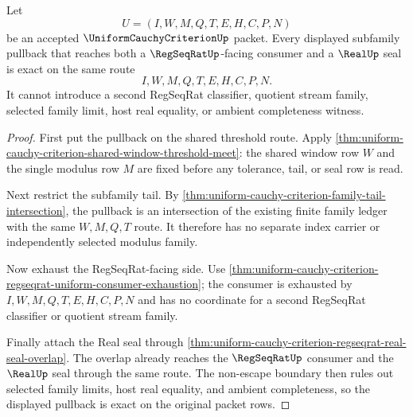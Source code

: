 \begin{theorem}
\label{thm:uniform-cauchy-criterion-regseqrat-real-seal-pullback-exactness}
Let
$$
U=(I,W,M,Q,T,E,H,C,P,N)
$$
be an accepted $\UniformCauchyCriterionUp$ packet. Every displayed subfamily pullback that reaches both a $\RegSeqRatUp$-facing consumer and a $\RealUp$ seal is exact on the same route
$$
I,W,M,Q,T,E,H,C,P,N.
$$
It cannot introduce a second RegSeqRat classifier, quotient stream family, selected family limit, host real equality, or ambient completeness witness.
\end{theorem}
\begin{proof}
First put the pullback on the shared threshold route. Apply \autoref{thm:uniform-cauchy-criterion-shared-window-threshold-meet}: the shared window row $W$ and the single modulus row $M$ are fixed before any tolerance, tail, or seal row is read.

Next restrict the subfamily tail. By \autoref{thm:uniform-cauchy-criterion-family-tail-intersection}, the pullback is an intersection of the existing finite family ledger with the same $W,M,Q,T$ route. It therefore has no separate index carrier or independently selected modulus family.

Now exhaust the RegSeqRat-facing side. Use \autoref{thm:uniform-cauchy-criterion-regseqrat-uniform-consumer-exhaustion}; the consumer is exhausted by $I,W,M,Q,T,E,H,C,P,N$ and has no coordinate for a second RegSeqRat classifier or quotient stream family.

Finally attach the Real seal through \autoref{thm:uniform-cauchy-criterion-regseqrat-real-seal-overlap}. The overlap already reaches the $\RegSeqRatUp$ consumer and the $\RealUp$ seal through the same route. The non-escape boundary then rules out selected family limits, host real equality, and ambient completeness, so the displayed pullback is exact on the original packet rows.
\end{proof}

